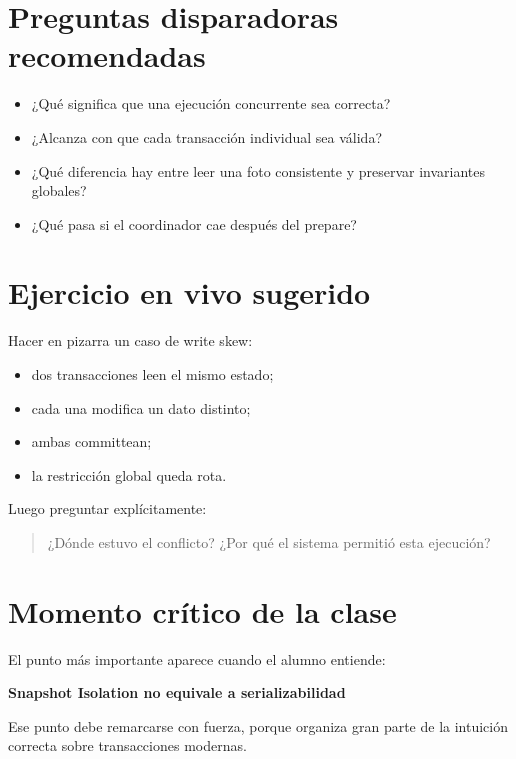 \documentclass[variant=docente,cover=institutional,mode=screen]{ua-engineering-v6-article}
\begin{document}
\section{Preguntas disparadoras recomendadas}

\begin{itemize}
\item ¿Qué significa que una ejecución concurrente sea correcta?
\item ¿Alcanza con que cada transacción individual sea válida?
\item ¿Qué diferencia hay entre leer una foto consistente y preservar invariantes globales?
\item ¿Qué pasa si el coordinador cae después del prepare?
\end{itemize}

\section{Ejercicio en vivo sugerido}

Hacer en pizarra un caso de write skew:

\begin{itemize}
\item dos transacciones leen el mismo estado;
\item cada una modifica un dato distinto;
\item ambas committean;
\item la restricción global queda rota.
\end{itemize}

Luego preguntar explícitamente:

\begin{quote}
¿Dónde estuvo el conflicto? ¿Por qué el sistema permitió esta ejecución?
\end{quote}

\section{Momento crítico de la clase}

El punto más importante aparece cuando el alumno entiende:

\begin{center}
\textbf{Snapshot Isolation no equivale a serializabilidad}
\end{center}

Ese punto debe remarcarse con fuerza, porque organiza gran parte de la intuición correcta sobre transacciones modernas.
\end{document}

